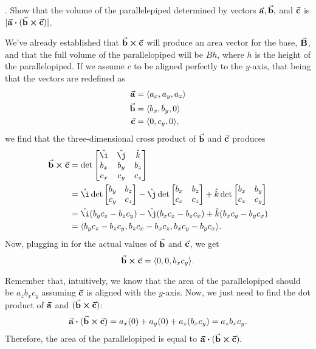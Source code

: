 \documentclass{report}
\newcounter{problemctr}
\newcounter{subproblemctr}[problemctr]
\newcommand{\problem}[1]{%
  \stepcounter{problemctr}%
  \setcounter{subproblemctr}{0}%
  \noindent\arabic{problemctr}. #1\par
}
\newenvironment{answer}
  {\begin{minipage}{\linewidth}}
  {\end{minipage}}
\begin{document}
\problem{Show that the volume of the parallelepiped determined by vectors $\va{a}, \va{b},$ and $\va{c}$ is $|\va{a} \vdot (\va{b} \cross \va{c})|$.}
\begin{answer}
We've already established that $\va{b} \cross \va{c}$ will produce an area vector for the base, $\va{B}$, and that the full volume of the parallelopiped will be $Bh$, where $h$ is the height of the parallelopiped. If we assume $c$ to be aligned perfectly to the $y$-axis, that being that the vectors are redefined as
\begin{align*}
\va{a} &= \langle a_x, a_y, a_z \rangle \\
\va{b} &= \langle b_x, b_y, 0 \rangle \\
\va{c} &= \langle 0, c_y, 0 \rangle,
\end{align*}
we find that the three-dimensional cross product of $\va{b}$ and $\va{c}$ produces
\begin{align*}
\va{b} \cross \va{c} &= \det 
\begin{bmatrix}
\hat{\i} & \hat{\j} & \hat{k} \\
b_x & b_y & b_z \\
c_x & c_y & c_z
\end{bmatrix} \\
&= \hat{\i} \det \begin{bmatrix} b_y & b_z \\ c_y & c_z \end{bmatrix}
 - \hat{\j} \det \begin{bmatrix} b_x & b_z \\ c_x & c_z \end{bmatrix}
 + \hat{k} \det \begin{bmatrix} b_x & b_y \\ c_x & c_y \end{bmatrix} \\
&= \hat{\i} (b_y c_z - b_z c_y) - \hat{\j} (b_x c_z - b_z c_x) + \hat{k} (b_x c_y - b_y c_x) \\
&= \langle b_y c_z - b_z c_y, b_z c_x - b_x c_z, b_x c_y - b_y c_x \rangle.
\end{align*}
Now, plugging in for the actual values of $\va{b}$ and $\va{c}$, we get
$$\va{b} \cross \va{c} = \langle 0, 0, b_x c_y \rangle.$$

Remember that, intuitively, we know that the area of the parallelopiped should be $a_z b_x c_y$ assuming $\va{c}$ is aligned with the $y$-axis. Now, we just need to find the dot product of $\va{a}$ and $(\va{b} \cross \va{c})$:
\begin{align*}
\va{a} \vdot (\va{b} \cross \va{c}) = a_x (0) + a_y (0) + a_z (b_x c_y) = a_z b_x c_y.
\end{align*}
Therefore, the area of the parallelopiped is equal to $\va{a} \vdot (\va{b} \cross \va{c}).$
\end{answer}
\end{document}
